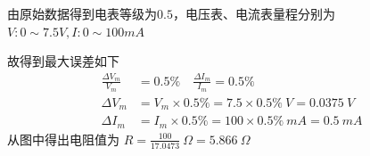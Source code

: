 \documentclass[UTF8]{ctexart}
\begin{document}
由原始数据得到电表等级为$0.5$，电压表、电流表量程分别为$V:0 \sim 7.5V,I:0 \sim 100 mA$

故得到最大误差如下
\begin{align*}
    \frac{\Delta V_m}{V_m} &= 0.5 \%  \quad\frac{\Delta I_m}{I_m} = 0.5 \%  \\
    \Delta V_m &= V_m \times 0.5 \% = 7.5 \times 0.5 \%  \ V= 0.0375 \ V \\
    \Delta I_m &= I_m \times 0.5 \% = 100 \times 0.5 \%  \ mA= 0.5\ mA 
\end{align*}
从图中得出电阻值为 $R = \frac{100}{17.0473} \ \Omega= 5.866 \ \Omega$
\end{document}
